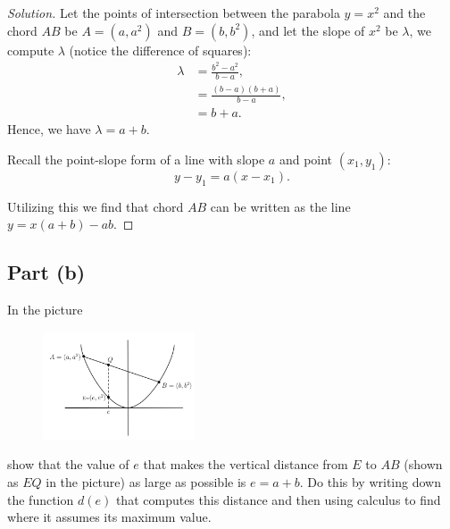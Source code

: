 \documentclass[letterpaper, 12pt]{amsart}
\theoremstyle{definition}  %
\begin{document}
		\begin{proof}[Solution]
		Let the points of intersection between the parabola $y = x^{2}$ and the chord $AB$ be $A = (a, a^{2})$ and $B = (b, b^{2})$, and let the slope of $x^{2}$ be $\lambda$, we compute $\lambda$ (notice the difference of squares):
			\begin{align*}
				\lambda &= \frac{b^{2} - a^{2}}{b - a}, \\
				&= \frac{(b - a)(b + a)}{b - a}, \\
				&= b + a.
			\end{align*}
		Hence, we have $\lambda = a + b$.

		Recall the point-slope form of a line with slope $a$ and point $(x_{1}, y_{1})$: $$y - y_{1} = a(x - x_{1}).$$
		
		Utilizing this we find that chord $AB$ can be written as the line $y = x(a + b) - ab$.
		\end{proof}
	
		\subsection*{Part (b)}
		In the picture 
		\begin{figure}[h]
		\includegraphics[width=0.4\textwidth]{figures/1.png}
		\end{figure}

		show that the value of $e$ that makes the vertical distance from $E$ to $AB$ (shown as $EQ$ in the picture) as large as possible is $e = a+b$. 
		Do this by writing down the function $d(e)$ that computes this distance and then using calculus to find where it assumes its maximum value.
\end{document}
